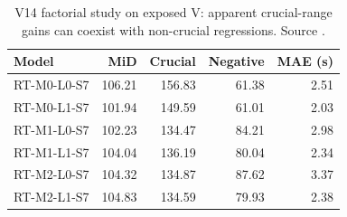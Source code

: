 \begin{table}[tbp]
\centering\small
\caption{V14 factorial study on exposed V: apparent crucial-range gains can coexist with non-crucial regressions. Source .}
\label{tab:late_v14}
\begin{tabular}{lrrrr}
\toprule
\textbf{Model} & \textbf{MiD} & \textbf{Crucial} & \textbf{Negative} & \textbf{MAE (s)} \\
\midrule
RT-M0-L0-S7 & 106.21 & 156.83 & 61.38 & 2.51 \\
RT-M0-L1-S7 & 101.94 & 149.59 & 61.01 & 2.03 \\
RT-M1-L0-S7 & 102.23 & 134.47 & 84.21 & 2.98 \\
RT-M1-L1-S7 & 104.04 & 136.19 & 80.04 & 2.34 \\
RT-M2-L0-S7 & 104.32 & 134.87 & 87.62 & 3.37 \\
RT-M2-L1-S7 & 104.83 & 134.59 & 79.93 & 2.38 \\
\bottomrule
\end{tabular}
\end{table}